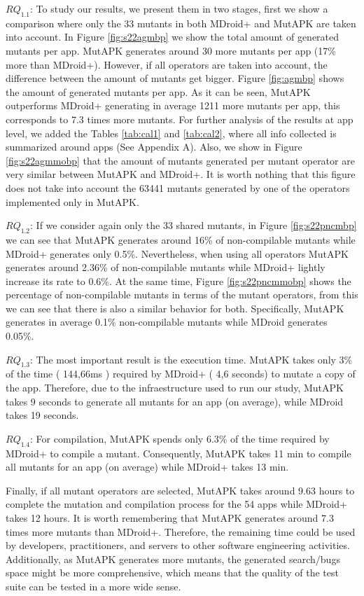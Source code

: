 \textbf{\textit{$RQ_{1.1}$}}: To study our results, we present them in two stages, first we show a comparison where only the 33 mutants  in both MDroid+ and MutAPK are taken into account. In Figure \ref{fig:s22agmbp} we show the total amount of generated mutants per app. MutAPK generates around 30 more mutants per app (17\% more than MDroid+). However, if all operators are taken into account, the difference between the amount of mutants get bigger. Figure \ref{fig:agmbp} shows the amount of generated mutants per app. As it can be seen, MutAPK outperforms MDroid+ generating in average 1211 more mutants per app, this corresponds to 7.3 times more mutants. For further analysis of the results at app level, we added the Tables \ref{tab:cal1} and \ref{tab:cal2}, where all info collected is summarized around apps (See Appendix A). Also, we show in Figure \ref{fig:s22agmmobp} that the amount of mutants generated per mutant operator are very similar between MutAPK and MDroid+. It is worth nothing that this figure does not take into account the 63441 mutants generated by one of the operators implemented only in MutAPK. 

\textbf{\textit{$RQ_{1.2}$}}: If we consider again only the 33 shared mutants, in Figure \ref{fig:s22pncmbp} we can see that MutAPK generates around 16\% of non-compilable mutants while MDroid+ generates only 0.5\%. Nevertheless, when using all operators MutAPK generates around 2.36\% of non-compilable mutants while MDroid+ lightly increase its rate to 0.6\%. At the same time, Figure \ref{fig:s22pncmmobp} shows the percentage of non-compilable mutants in terms of the mutant operators, from this we can see that there is also a similar behavior for both. Specifically, MutAPK generates in average 0.1\% non-compilable mutants while MDroid generates 0.05\%.

\textbf{\textit{$RQ_{1.3}$}}: The most important result is the execution time. MutAPK takes only 3\% of the time ( 144,66ms ) required by MDroid+ ( 4,6 seconds) to mutate a copy of the app. Therefore, due to the infraestructure used to run our study, MutAPK takes 9 seconds to generate all mutants for an app (on average), while MDroid takes 19 seconds. 

\textbf{\textit{$RQ_{1.4}$}}: For compilation, MutAPK spends only 6.3\% of the time required by MDroid+ to compile a mutant. Consequently, MutAPK takes 11 min to compile all mutants for an app (on average) while MDroid+ takes 13 min.


Finally, if all mutant operators are selected, MutAPK takes around 9.63 hours to complete the mutation and compilation process for the 54 apps while MDroid+ takes 12 hours.  It is worth remembering that MutAPK generates around 7.3 times more mutants than MDroid+. Therefore, the remaining time could be used by developers,  practitioners, and servers to other software engineering activities. Additionally, as MutAPK generates more mutants, the generated search/bugs space  might be more comprehensive, which means that the quality of the test suite can be tested in a more wide sense.

